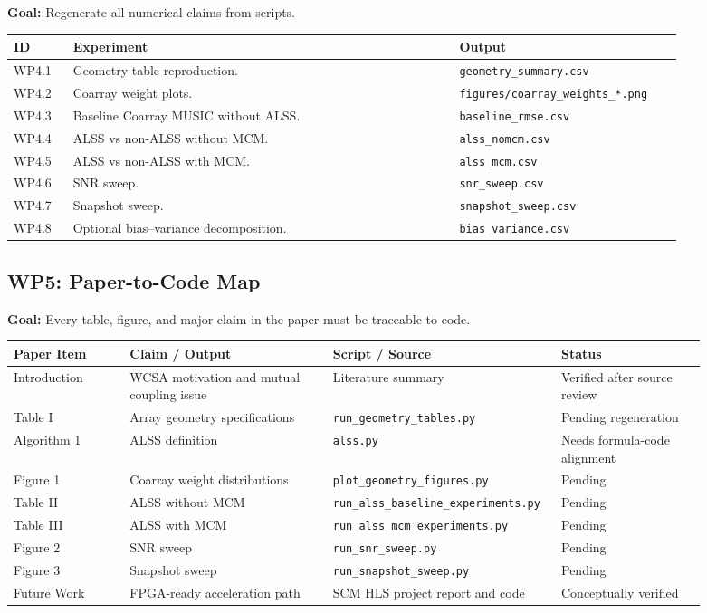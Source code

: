 \documentclass[11pt,letterpaper]{article}
\newcommand{\codepath}[1]{\texttt{#1}}
\begin{document}
\textbf{Goal:} Regenerate all numerical claims from scripts.

\begin{longtable}{p{0.08\linewidth}p{0.52\linewidth}p{0.30\linewidth}}
\toprule
ID & Experiment & Output \\
\midrule
WP4.1 & Geometry table reproduction. & \codepath{geometry\_summary.csv} \\
WP4.2 & Coarray weight plots. & \codepath{figures/coarray\_weights\_*.png} \\
WP4.3 & Baseline Coarray MUSIC without ALSS. & \codepath{baseline\_rmse.csv} \\
WP4.4 & ALSS vs non-ALSS without MCM. & \codepath{alss\_nomcm.csv} \\
WP4.5 & ALSS vs non-ALSS with MCM. & \codepath{alss\_mcm.csv} \\
WP4.6 & SNR sweep. & \codepath{snr\_sweep.csv} \\
WP4.7 & Snapshot sweep. & \codepath{snapshot\_sweep.csv} \\
WP4.8 & Optional bias--variance decomposition. & \codepath{bias\_variance.csv} \\
\bottomrule
\end{longtable}

\subsection{WP5: Paper-to-Code Map}

\textbf{Goal:} Every table, figure, and major claim in the paper must be traceable to code.

\begin{longtable}{p{0.16\linewidth}p{0.28\linewidth}p{0.25\linewidth}p{0.20\linewidth}}
\toprule
Paper Item & Claim / Output & Script / Source & Status \\
\midrule
Introduction & WCSA motivation and mutual coupling issue & Literature summary & Verified after source review \\
Table I & Array geometry specifications & \codepath{run\_geometry\_tables.py} & Pending regeneration \\
Algorithm 1 & ALSS definition & \codepath{alss.py} & Needs formula-code alignment \\
Figure 1 & Coarray weight distributions & \codepath{plot\_geometry\_figures.py} & Pending \\
Table II & ALSS without MCM & \codepath{run\_alss\_baseline\_experiments.py} & Pending \\
Table III & ALSS with MCM & \codepath{run\_alss\_mcm\_experiments.py} & Pending \\
Figure 2 & SNR sweep & \codepath{run\_snr\_sweep.py} & Pending \\
Figure 3 & Snapshot sweep & \codepath{run\_snapshot\_sweep.py} & Pending \\
Future Work & FPGA-ready acceleration path & SCM HLS project report and code & Conceptually verified \\
\bottomrule
\end{longtable}
\end{document}
